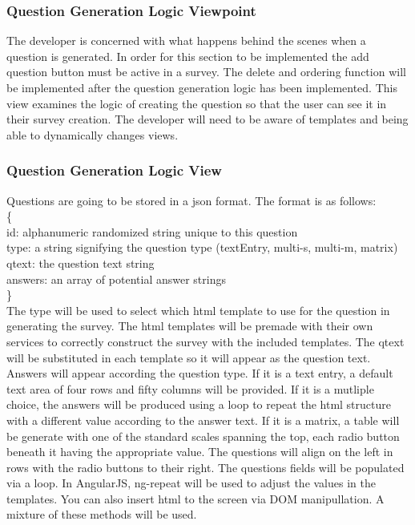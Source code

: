 \documentclass[letterpaper,10pt,serif, draftclsnofoot,onecolumn, compsoc, titlepage]{IEEEtran}
\begin{document}
\subsubsection{Question Generation Logic Viewpoint}
The developer is concerned with what happens behind the scenes when a question is generated. In order for this section to be 
implemented the add question button must be active in a survey. The delete and ordering function will be implemented after the 
question generation logic has been implemented. This view examines the logic of creating the question so that the user can see 
it in their survey creation. The developer will need to be aware of templates and being able to dynamically changes views. 
\subsubsection{Question Generation Logic View}
Questions are going to be stored in a json format. The format is as follows: \\
\{\\
\indent id: alphanumeric randomized string unique to this question \\
\indent type: a string signifying the question type (textEntry, multi-s, multi-m, matrix)\\
\indent qtext: the question text string \\
\indent answers: an array of potential answer strings\\
\}\\
The type will be used to select which html template to use for the question in generating the survey. The html templates will be
premade with their own services to correctly construct the survey with the included templates. The qtext will be substituted in each 
template so it will appear as the question text. Answers will appear according the question type. If it is a text entry, a default text area of four rows and fifty columns will be provided. If it is a mutliple choice, the answers will be produced using a loop to repeat the html structure with a different value according to the answer text. If it is a matrix, a table will be generate with one of the standard scales spanning the top, each radio button beneath it having the appropriate value. The questions will align on the left in rows with 
the radio buttons to their right. The questions fields will be populated via a loop. In AngularJS, ng-repeat will be used to adjust the values in the templates. You can also insert html to the screen via DOM manipullation. A mixture of these methods will be used. 
\end{document}
